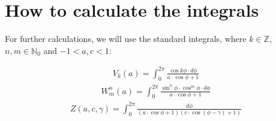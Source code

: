 \section{How to calculate the integrals}
For further calculations, we will use the standard integrals, where $k \in \mathbb{Z}$, $n, m \in \mathbb{N}_0$ and $- 1 < a, c < 1$:

\begin{equation}\begin{aligned}
V_k(a) = \int_{0}^{2 \pi} \frac{\cos k\phi \cdot d\phi}{a\cdot \cos \phi + 1}
\end{aligned}\end{equation}
\begin{equation}\begin{aligned}
W_m^n(a) = \int_{0}^{2 \pi} \frac{\sin^n \phi \cdot \cos^m \phi \cdot d \phi }{a\cdot \cos \phi + 1}
\end{aligned}\end{equation}
\begin{equation}\begin{aligned}
Z(a, c, \gamma) = \int_{0}^{2 \pi} \frac{d \phi}{(a\cdot \cos \phi + 1)(c \cdot \cos (\phi - \gamma) + 1)}
\end{aligned}\end{equation}


